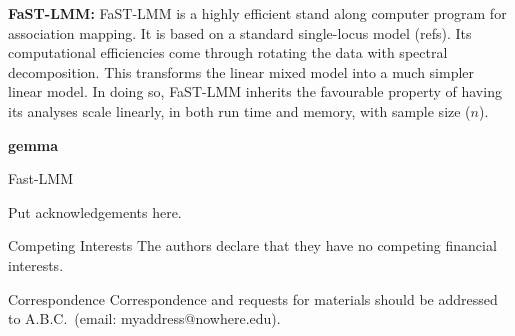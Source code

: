 \documentclass{nature}
\begin{document}
\textbf{FaST-LMM:}  FaST-LMM is a highly efficient stand along computer program for association mapping. It is based on a standard single-locus model (refs). Its computational efficiencies come through rotating the data with spectral decomposition. This 
transforms the linear mixed 
model into a much simpler linear model.  In doing so, FaST-LMM inherits the favourable property of having its analyses 
scale linearly, in both run time and memory, with sample size ($n$). 

\textbf{gemma}

Fast-LMM





\begin{addendum}
 \item Put acknowledgements here.
 \item[Competing Interests] The authors declare that they have no
competing financial interests.
 \item[Correspondence] Correspondence and requests for materials
should be addressed to A.B.C.~(email: myaddress@nowhere.edu).
\end{addendum}
\end{document}
